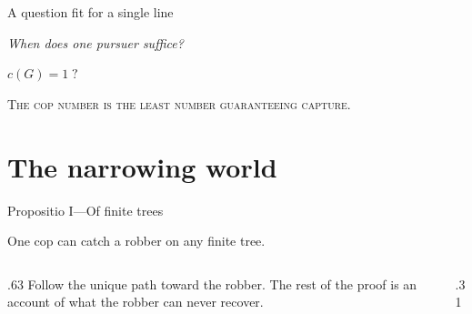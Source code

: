 \documentclass[aspectratio=169,11pt]{beamer}
\begin{document}
\begin{frame}{A question fit for a single line}
  \centering
  \AtlasGrandFleuron[30mm]\par\bigskip
  {\fontsize{25}{31}\selectfont\itshape
    When does one pursuer suffice?\par}
  \bigskip
  {\color{AtlasRubric}\fontsize{30}{34}\selectfont $c(G)=1\;?$\par}
  \bigskip
  {\small\scshape The cop number is the least number guaranteeing capture.}
\end{frame}

\section{The narrowing world}

\begin{frame}[label=grand-trees]{Propositio I\enspace—\enspace Of finite trees}
  \begin{theorem}\label{grand:tree}
    \Large One cop can catch a robber on any finite tree.
  \end{theorem}
  \medskip
  \begin{columns}[T,onlytextwidth]
    \begin{column}{.63\textwidth}
      Follow the unique path toward the robber. The rest of the proof
      is an account of what the robber can never recover.
    \end{column}
    \begin{column}{.31\textwidth}
    \end{column}
  \end{columns}
\end{frame}
\end{document}
